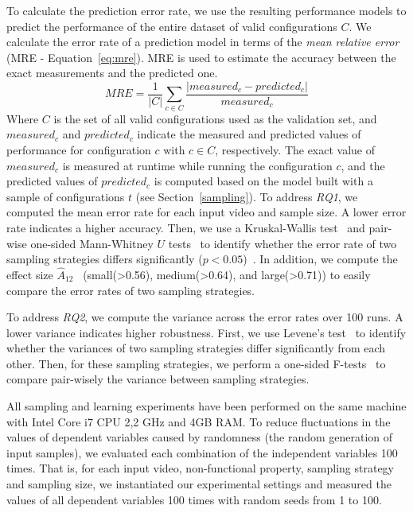 To calculate the prediction error rate, we use the resulting performance models to predict the performance of the entire dataset of valid configurations $C$. %
We calculate the error rate of a prediction model in terms of the \textit{mean relative error} (MRE - Equation~\ref{eq:mre}).
MRE is used to estimate the accuracy between the exact measurements and the predicted one.
\begin{equation}
    MRE = \frac{1}{|C|} \sum_{c \in C} \frac{|measured_{c} - predicted_{c}|}{measured_{c}}
    \label{eq:mre}
\end{equation}
Where $C$ is the set of all valid configurations used as the validation set, and $measured_{c}$ and $predicted_{c}$ indicate the measured and predicted values of performance for configuration $c$ with $c \in C$, respectively.
The exact value of $measured_{c}$ is measured at runtime while running the configuration $c$, and the predicted values of $predicted_{c}$ is computed based on the model built with a sample of configurations $t$ (see Section~\ref{sampling}).
To address \textit{RQ1}, we computed the mean error rate for each input video and sample size. A lower error rate indicates a higher accuracy.
Then, we use a Kruskal-Wallis test~\cite{kruskal1952} and pair-wise one-sided Mann-Whitney $U$ tests~\cite{mann1947} to identify whether the error rate of two sampling strategies differs significantly ($p < 0.05$)~\cite{arcuri2011}.
In addition, we compute the effect size $\hat{A}_{12}$~\cite{vargha2000} (small(>0.56), medium(>0.64), and large(>0.71)) to easily compare the error rates of two sampling strategies.

To address \textit{RQ2}, we compute the variance across the error rates over 100 runs.
A lower variance indicates higher robustness.
First, we use Levene’s test~\cite{levene1961} to identify whether the variances of two sampling strategies differ significantly from each other. Then, for these sampling strategies, we perform a one-sided F-tests~\cite{snedecor1989} to compare pair-wisely the variance between sampling strategies. %

All sampling and learning experiments have been performed on the same machine with Intel Core i7 CPU 2,2 GHz and 4GB RAM. 
To reduce fluctuations in the values of dependent variables caused by randomness (\eg the random generation of input samples), we evaluated each combination of the independent variables 100 times. That is, for each input video, non-functional property, sampling strategy and sampling size, we instantiated our experimental settings and measured the values of all dependent variables 100 times with random seeds from 1 to 100.